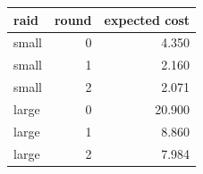\begin{tabular}{lrr}
\toprule
raid & round & expected cost \\
\midrule
small & 0 & 4.350 \\
small & 1 & 2.160 \\
small & 2 & 2.071 \\
large & 0 & 20.900 \\
large & 1 & 8.860 \\
large & 2 & 7.984 \\
\bottomrule
\end{tabular}
